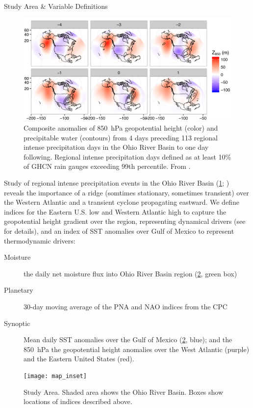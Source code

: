 \begin{block}{Study Area \& Variable Definitions}
    \begin{figure}
        \centering
        \includegraphics[width=0.95\columnwidth]{../FigExternal/djf_composites}
        \caption{Composite anomalies of \SI{850}{\hecto\pascal} geopotential height (color) and precipitable water (contours) from 4 days preceding 113 regional intense precipitation days in the Ohio River Basin to one day following. Regional intense precipitation days defined as at least 10\% of GHCN rain gauges exceeding 99th percentile. From \cite{Farnham2016}.}
        \label{fig:djf-composites}
    \end{figure}
    Study of regional intense precipitation events in the Ohio River Basin (\cref{fig:djf-composites}; \cite{Farnham2016}) reveals the importance of a ridge (somtimes stationary, sometimes transient) over the Western Atlantic and a transient cyclone propagating eastward.
    We define indices for the Eastern U.S. low and Western Atlantic high to capture the geopotential height gradient over the region, representing dynamical drivers (see \cite{Farnham2016,Nakamura2012} for details), and an index of SST anomalies over Gulf of Mexico \cite[see][and references therein]{Steinschneider2016a} to represent thermodynamic drivers:
    \begin{description}
        \item[Moisture] the daily net moisture flux into Ohio River Basin region (\cref{fig:study-area}, green box)
        \item[Planetary] 30-day moving average of the PNA and NAO indices from the CPC
        \item[Synoptic] Mean daily SST anomalies over the Gulf of Mexico (\cref{fig:study-area}, blue); and the \SI{850}{\hecto\pascal} the geopotential height anomalies over the West Atlantic (purple) and the Eastern United States (red).
    \end{description}
    \begin{figure}
        \centering
        \texttt{[image: map\_inset]}
        \caption{Study Area. Shaded area shows the Ohio River Basin. Boxes show locations of indices described above.}
        \label{fig:study-area}
    \end{figure}
\end{block}
